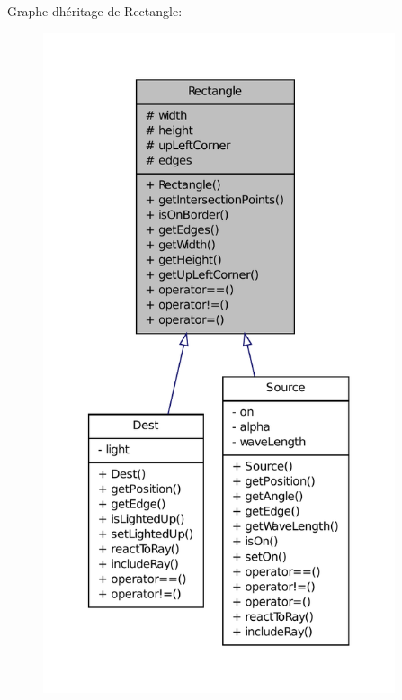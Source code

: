 Graphe d\textquotesingle{}héritage de Rectangle\+:\nopagebreak
\begin{figure}[H]
\begin{center}
\leavevmode
\includegraphics[height=550pt]{dd/d23/classRectangle__inherit__graph}
\end{center}
\end{figure}



